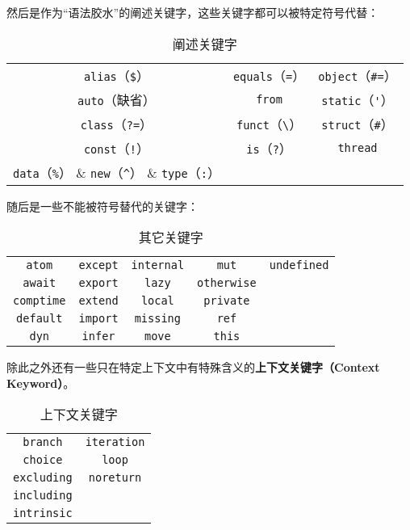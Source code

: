 然后是作为“语法胶水”的阐述关键字，这些关键字都可以被特定符号代替：

\begin{table}[H]
    \centering
    \begin{tabular}{|c|c|c|} \hline
        \lstinline!alias!（\texttt{\$}）   & \lstinline!equals!（\lstinline!=!） & \lstinline!object!（\lstinline!#=!）  \\
        \lstinline!auto!（缺省）	& \lstinline!from!  & \lstinline!static!（\lstinline!'!） \\
        \lstinline!class!（\lstinline!?=!）   & \lstinline!funct!（\lstinline!\!） & \lstinline!struct!（\lstinline!#!）  \\
        \lstinline!const!（\lstinline|!|）   & \lstinline!is!（\lstinline!?!） 	& \lstinline!thread!  \\
        \lstinline!data!（\lstinline!%!）   & \lstinline!new!（\lstinline!^!）	& \lstinline!type!（\lstinline!:!）  \\\hline
    \end{tabular}
    \caption{阐述关键字}
    \label{tab:elaborator-keywords}
\end{table}

随后是一些不能被符号替代的关键字：

\begin{table}[H]
    \centering
    \begin{tabular}{|c|c|c|c|c|} \hline
        \lstinline!atom!    & \lstinline!except!    & \lstinline!internal!	& \lstinline!mut! 		& \lstinline!undefined!  \\
        \lstinline!await!   & \lstinline!export!    & \lstinline!lazy!     	& \lstinline!otherwise! & \\
        \lstinline!comptime!& \lstinline!extend!    & \lstinline!local!     & \lstinline!private! & \\
        \lstinline!default! & \lstinline!import!    & \lstinline!missing! 	& \lstinline!ref! & \\
        \lstinline!dyn!     & \lstinline!infer!  	& \lstinline!move!   	& \lstinline!this! & \\\hline
    \end{tabular}
    \caption{其它关键字}
    \label{tab:other-keywords}
\end{table}

除此之外还有一些只在特定上下文中有特殊含义的\textbf{上下文关键字（Context Keyword）}。

\begin{table}[H]
    \centering
    \begin{tabular}{|c|c|} \hline
        \lstinline!branch!    & \lstinline!iteration! \\
        \lstinline!choice! & \lstinline!loop! \\
        \lstinline!excluding! & \lstinline!noreturn! \\
        \lstinline!including! & \\
        \lstinline!intrinsic! & \\\hline
    \end{tabular}
    \caption{上下文关键字}
    \label{tab:context-keywords}
\end{table}

